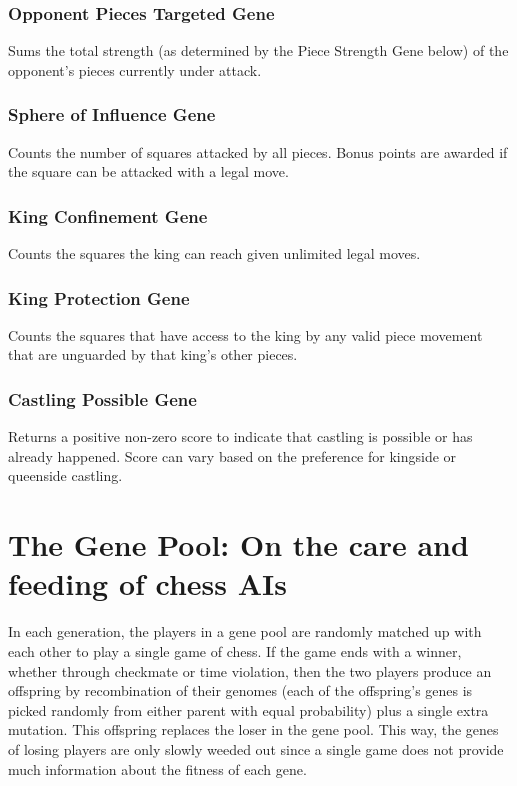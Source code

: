 \documentclass[letter]{article}
\renewcommand\_{\textunderscore\allowbreak}
\begin{document}
\subsubsection{Opponent Pieces Targeted Gene}
Sums the total strength (as determined by the Piece Strength Gene below) of the opponent's pieces currently under attack.

\subsubsection{Sphere of Influence Gene}
Counts the number of squares attacked by all pieces. Bonus points are awarded if the square can be attacked with a legal move.

\subsubsection{King Confinement Gene}
Counts the squares the king can reach given unlimited legal moves.

\subsubsection{King Protection Gene}
Counts the squares that have access to the king by any valid piece movement that are unguarded by that king's other pieces.

\subsubsection{Castling Possible Gene}
Returns a positive non-zero score to indicate that castling is possible or has already happened. Score can vary based on the preference for kingside or queenside castling.




\section{The Gene Pool: On the care and feeding of chess AIs}

In each generation, the players in a gene pool are randomly matched up with each other to play a single game of chess. If the game ends with a winner, whether through checkmate or time violation, then the two players produce an offspring by recombination of their genomes (each of the offspring's genes is picked randomly from either parent with equal probability) plus a single extra mutation. This offspring replaces the loser in the gene pool. This way, the genes of losing players are only slowly weeded out since a single game does not provide much information about the fitness of each gene.
\end{document}
